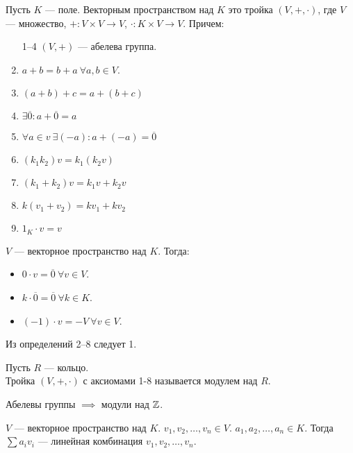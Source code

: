 \begin{definition}
    Пусть $K$ --- поле. Векторным пространством над $K$ это тройка  $\left( V, +, \cdot \right)$, где  $V$ --- множество,  $+\!: V \times V \to V$,  $\cdot\!: K \times V \to V$. Причем:
     \begin{enumerate}
         \item [1--4] $(V, +)$ --- абелева группа.
     \setcounter{enumi}{0}
     \item $a + b = b+a\ \forall a, b \in V$.
     \item  $(a+b)+c = a+(b+c)$
     \item  $\exists \overline{0}\!: a + \overline{0} = a$
     \item  $\forall a \in v\ \exists (-a)\!: a+(-a) = \overline{0}$
     \item $(k_1k_2)v = k_1(k_2v)$
     \item $(k_1+k_2)v = k_1v+k_2v$
     \item $k(v_1 + v_2) = kv_1 + kv_2$
     \item $1_K \cdot v = v$
    \end{enumerate}
\end{definition}
\begin{remark}
    $V$ --- векторное пространство над  $K$. Тогда: 
     \begin{itemize}
         \item $0 \cdot v = \overline{0}\ \forall v \in V$.
         \item  $k \cdot \overline{0} = \overline{0}\ \forall k \in K$.
         \item $(-1)\cdot v = -V\ \forall v \in V$.
    \end{itemize}
\end{remark}
\begin{remark}
    Из определений 2--8 следует 1.
\end{remark}
\begin{definition}
    Пусть $R$ --- кольцо. \\
    Тройка  $\left(V, +, \cdot\right)$ с аксиомами 1-8 называется модулем над $R$.
\end{definition}
\begin{remark}
    Абелевы группы $\implies$ модули над  $\mathbb{Z}$.
\end{remark}
\begin{definition}
    $V$ --- векторное пространство над  $K$. $v_1, v_2, \ldots, v_n \in V$. $a_1, a_2, \ldots, a_n \in K$. Тогда $\sum a_i v_i$ --- линейная комбинация  $v_1, v_2, \ldots, v_n$.
\end{definition}
